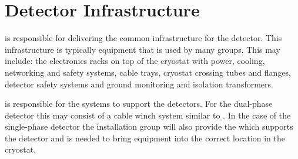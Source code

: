\section{Detector Infrastructure}
\label{sec:fdsp-coord-infrastructure}

 is responsible for delivering the common infrastructure for
the detector. This infrastructure is typically equipment that is used
by many groups. This may include: the electronics racks on top of the
cryostat with power, cooling, networking and safety systems, cable
trays, cryostat crossing tubes and flanges, detector safety systems
and ground monitoring and isolation transformers.

 is responsible for the systems to support the
detectors. For the dual-phase detector this may consist of a cable
winch system similar to .  In the case of the
single-phase detector the installation group will also provide the
 which supports the detector and is needed to bring
equipment into the correct location in the cryostat.

